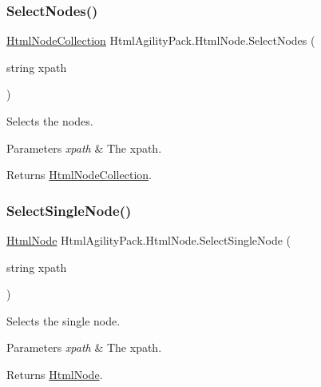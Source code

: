 \subsubsection{\texorpdfstring{Select\+Nodes()}{SelectNodes()}}
{\footnotesize\ttfamily \hyperlink{class_html_agility_pack_1_1_html_node_collection}{Html\+Node\+Collection} Html\+Agility\+Pack.\+Html\+Node.\+Select\+Nodes (\begin{DoxyParamCaption}\item[{string}]{xpath }\end{DoxyParamCaption})\hspace{0.3cm}{\ttfamily [inline]}}



Selects the nodes. 


\begin{DoxyParams}{Parameters}
{\em xpath} & The xpath.\\
\hline
\end{DoxyParams}
\begin{DoxyReturn}{Returns}
\hyperlink{class_html_agility_pack_1_1_html_node_collection}{Html\+Node\+Collection}.
\end{DoxyReturn}
\mbox{\label{class_html_agility_pack_1_1_html_node_aa3fda9875d81027009b9d15b51c77add}} 
\subsubsection{\texorpdfstring{Select\+Single\+Node()}{SelectSingleNode()}}
{\footnotesize\ttfamily \hyperlink{class_html_agility_pack_1_1_html_node}{Html\+Node} Html\+Agility\+Pack.\+Html\+Node.\+Select\+Single\+Node (\begin{DoxyParamCaption}\item[{string}]{xpath }\end{DoxyParamCaption})\hspace{0.3cm}{\ttfamily [inline]}}



Selects the single node. 


\begin{DoxyParams}{Parameters}
{\em xpath} & The xpath.\\
\hline
\end{DoxyParams}
\begin{DoxyReturn}{Returns}
\hyperlink{class_html_agility_pack_1_1_html_node}{Html\+Node}.
\end{DoxyReturn}

